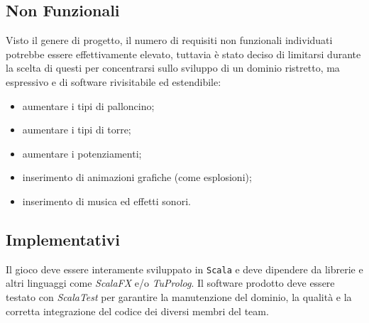 \subsection{Non Funzionali}
Visto il genere di progetto, il numero di requisiti non funzionali individuati potrebbe essere effettivamente elevato, tuttavia è stato deciso di limitarsi durante la scelta di questi per concentrarsi sullo sviluppo di un dominio ristretto, ma espressivo e di software rivisitabile ed estendibile:
\begin{itemize}
    \item aumentare i tipi di palloncino;
    \item aumentare i tipi di torre;
    \item aumentare i potenziamenti;
    \item inserimento di animazioni grafiche (come esplosioni);
    \item inserimento di musica ed effetti sonori.
\end{itemize}

\subsection{Implementativi}
Il gioco deve essere interamente sviluppato in \texttt{Scala} e deve dipendere da librerie e altri linguaggi come \textit{ScalaFX} e/o \textit{TuProlog}. Il software prodotto deve essere testato con \textit{ScalaTest} per garantire la manutenzione del dominio, la qualità e la corretta integrazione del codice dei diversi membri del team.